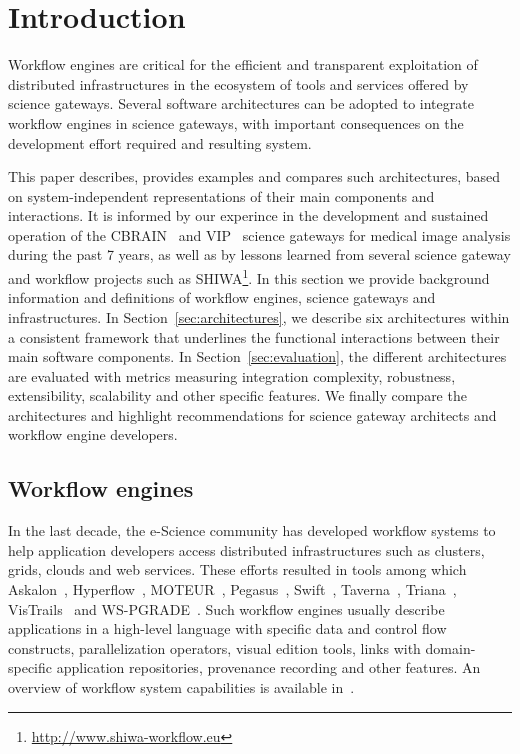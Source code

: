 \documentclass[preprint,3p,twocolumn]{elsarticle}
\begin{document}

\section{Introduction}

Workflow engines are critical for the efficient and transparent
exploitation of distributed infrastructures in the ecosystem of tools
and services offered by science gateways. Several software
architectures can be adopted to integrate workflow engines in science
gateways, with important consequences on the development effort
required and resulting system.

This paper describes, provides examples and compares such
architectures, based on system-independent representations of their
main components and interactions. It is informed by our experince in
the development and sustained operation of the CBRAIN~\cite{SHER-14}
and VIP~\cite{GLAT-13} science gateways for medical image analysis
during the past 7 years, as well as by lessons learned from several
science gateway and workflow projects such as
SHIWA\footnote{\url{http://www.shiwa-workflow.eu}}.  In this section
we provide background information and definitions of 
workflow engines, science gateways and infrastructures. In
Section~\ref{sec:architectures}, we describe six architectures within
a consistent framework that underlines the functional interactions
between their main software components. In
Section~\ref{sec:evaluation}, the different architectures are
evaluated with metrics measuring integration complexity, robustness,
extensibility, scalability and other specific features. We finally
compare the architectures and highlight recommendations for science
gateway architects and workflow engine developers.

\subsection{Workflow engines}

In the last decade, the e-Science community has developed workflow
systems to help application developers access distributed
infrastructures such as clusters, grids, clouds and web
services. These efforts resulted in tools among which
Askalon~\cite{fahringer2005askalon},
Hyperflow~\cite{balis2016hyperflow}, MOTEUR~\cite{GLAT-08i},
Pegasus~\cite{deelman2005pegasus,Deelman201517},
Swift~\cite{zhao2007swift}, Taverna~\cite{oinn2004taverna},
Triana~\cite{taylor2007triana}, VisTrails~\cite{callahan2006managing}
and WS-PGRADE~\cite{Kacsuk2012}. Such workflow engines usually
describe applications in a high-level language with specific data and
control flow constructs, parallelization operators, visual edition
tools, links with domain-specific application repositories, provenance
recording and other features. An overview of workflow system
capabilities is available in~\cite{deelman2009workflows}.
\end{document}
